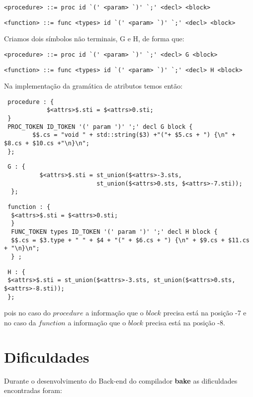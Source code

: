 \begin{lstlisting}[frame=single, language=pie]
<procedure> ::= proc id `(' <param> `)' `;' <decl> <block>
\end{lstlisting}

\begin{lstlisting}[frame=single, language=pie]
<function> ::= func <types> id `(' <param> `)' `;' <decl> <block>
\end{lstlisting}
 Criamos dois símbolos não terminais, G e H, de forma que:
 \begin{lstlisting}[frame=single, language=pie]
 <procedure> ::= proc id `(' <param> `)' `;' <decl> G <block>
 \end{lstlisting}
 
 \begin{lstlisting}[frame=single, language=pie, basicstyle=\small ]
 <function> ::= func <types> id `(' <param> `)' `;' <decl> H <block>
  \end{lstlisting}
  
  Na implementação da gramática de atributos temos então:
 
 \begin{verbatim}
 procedure : {
 			$<attrs>$.sti = $<attrs>0.sti; 
 }
 PROC_TOKEN ID_TOKEN '(' param ')' ';' decl G block {
 		$$.cs = "void " + std::string($3) +"("+ $5.cs + ") {\n" + $8.cs + $10.cs +"\n}\n";
 };
  \end{verbatim}
  \begin{verbatim}
 G : {
		  $<attrs>$.sti = st_union($<attrs>-3.sts,
		                  st_union($<attrs>0.sts, $<attrs>-7.sti)); 
  };
  \end{verbatim}
  \begin{verbatim}
 function : {
  $<attrs>$.sti = $<attrs>0.sti; 
  }
  FUNC_TOKEN types ID_TOKEN '(' param ')' ';' decl H block {
  $$.cs = $3.type + " " + $4 + "(" + $6.cs + ") {\n" + $9.cs + $11.cs + "\n}\n"; 
  } ;
  \end{verbatim}
  \begin{verbatim}
 H : { 
 $<attrs>$.sti = st_union($<attrs>-3.sts, st_union($<attrs>0.sts, $<attrs>-8.sti)); 
 };
 \end{verbatim}
pois no caso do $procedure$ a informação que o $block$ precisa está na posição -7 e no caso da $function$ a informação que o $block$ precisa está na posição -8.

\section{Dificuldades}
Durante o desenvolvimento do Back-end do compilador \textbf{bake} as dificuldades encontradas foram:

